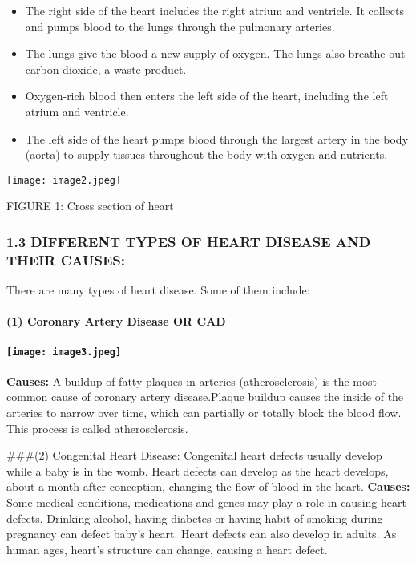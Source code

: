 \documentclass[
]{article}
\providecommand{\tightlist}{%
  \setlength{\itemsep}{0pt}\setlength{\parskip}{0pt}}
\begin{document}
\begin{itemize}
\tightlist
\item
  The right side of the heart includes the right atrium and ventricle.
  It collects and pumps blood to the lungs through the pulmonary
  arteries.
\item
  The lungs give the blood a new supply of oxygen. The lungs also
  breathe out carbon dioxide, a waste product.
\item
  Oxygen-rich blood then enters the left side of the heart, including
  the left atrium and ventricle.
\item
  The left side of the heart pumps blood through the largest artery in
  the body (aorta) to supply tissues throughout the body with oxygen and
  nutrients.
\end{itemize}

\texttt{[image: image2.jpeg]}

FIGURE 1: Cross section of heart

\hypertarget{different-types-of-heart-disease-and-their-causes}{%
\subsubsection{1.3 DIFFERENT TYPES OF HEART DISEASE AND THEIR
CAUSES:}\label{different-types-of-heart-disease-and-their-causes}}

There are many types of heart disease. Some of them include:

\hypertarget{coronary-artery-disease-or-cad}{%
\paragraph{(1) Coronary Artery Disease OR
CAD}\label{coronary-artery-disease-or-cad}}

\hypertarget{section}{%
\paragraph{\texorpdfstring{\protect\texttt{[image: image3.jpeg]}}{}}\label{section}}

\textbf{Causes:} A buildup of fatty plaques in arteries
(atherosclerosis) is the most common cause of coronary artery
disease.Plaque buildup causes the inside of the arteries to narrow over
time, which can partially or totally block the blood flow. This process
is called atherosclerosis.

\#\#\#(2) Congenital Heart Disease: Congenital heart defects usually
develop while a baby is in the womb. Heart defects can develop as the
heart develops, about a month after conception, changing the flow of
blood in the heart. \textbf{Causes:} Some medical conditions,
medications and genes may play a role in causing heart defects, Drinking
alcohol, having diabetes or having habit of smoking during pregnancy can
defect baby's heart. Heart defects can also develop in adults. As human
ages, heart's structure can change, causing a heart defect.
\end{document}
